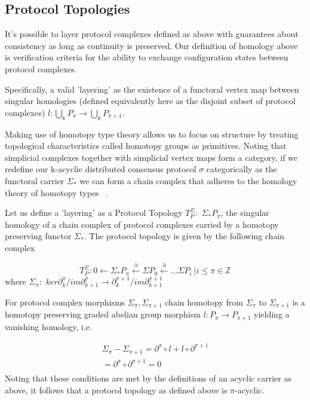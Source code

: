 \documentclass[runningheads]{llncs}
\begin{document}
\subsection{Protocol Topologies}
It's possible to layer protocol complexes defined as above with guarantees about consistency as long as continuity is preserved. Our definition of homology above is verification criteria for the ability to exchange configuration states between protocol complexes.

Specifically, a valid 'layering' as the existence of a functoral vertex map between singular homologies (defined equivalently here as the disjoint subset of protocol complexes) $l: \bigcup_{k} P_{\pi} \rightarrow \bigcup_{k} P_{\pi+1}$.

Making use of homotopy type theory allows us to focus on structure by treating topological characteristics called homotopy groups as primitives. Noting that simplicial complexes together with simplicial vertex maps form a category, if we redefine our k-acyclic distributed consensus protocol $\sigma$ categorically as the functoral carrier $\Sigma_{*}$  we can form a chain complex that adheres to the homology theory of homotopy types ~\cite{ref_article5}.

Let us define a 'layering' as a Protocol Topology $T^{\Sigma}_P: $ $\Sigma_{*}P_\pi$, the singular homology of a chain complex of protocol complexes carried by a homotopy preserving functor $\Sigma_*$. The protocol topology is given by the following chain complex

\begin{equation}
T^{\Sigma}_P: 0 \leftarrow \Sigma_{*}P_\pi \xleftarrow{\partial} \Sigma P_{0} \xleftarrow{\partial} \dots \Sigma P_i \ | i \leq \pi \in \mathbb{Z}
\end{equation}
where $\Sigma_\pi: $ $ker \partial^{\pi}_{k}/im \partial^{\pi}_{k+1} \rightarrow \partial^{\pi+1}_{k} /im \partial^{\pi+1}_{k+1}$ 

For protocol complex morphisms $\Sigma_\pi, \Sigma_{\pi+1}$ chain homotopy from $\Sigma_\pi$ to $\Sigma_{\pi+1}$ is a homotopy preserving graded abelian group morphism $l: P_{\pi} \rightarrow P_{\pi+1}$ yielding a vanishing homology, i.e. 

\begin{equation}
\begin{split}
\Sigma_\pi - \Sigma_{\pi+1} =  \partial^{\pi}\circ l + l \circ \partial^{\pi+1} \\
= \partial^\pi \circ \partial^{\pi+1} = 0 \\
\end{split}
\end{equation}
Noting that these conditions are met by the definitions of an acyclic carrier as above, it follows that a protocol topology as defined above is $\pi$-acyclic.
 
\end{document}
